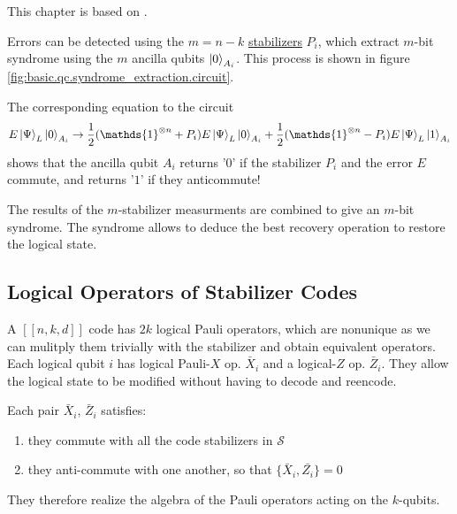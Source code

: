 This chapter is based on \cite{QECintro}.

Errors can be detected using the $m=n-k$ \hyperref[sec:basic.qc.stabilizer]{stabilizers} $P_i$, which extract $m$-bit syndrome using the $m$ ancilla qubits $\ket{0}_{A_i}$.
This process is shown in figure \ref{fig:basic.qc.syndrome_extraction.circuit}.

The corresponding equation to the circuit
\begin{equation}
    E \ket{\Psi}_L \ket{0}_{A_i} \rightarrow \frac{1}{2} (\mathds{1}^{\otimes n} + P_i) E \ket{\Psi}_L \ket{0}_{A_i} +  \frac{1}{2} (\mathds{1}^{\otimes n} - P_i) E   \ket{\Psi}_L \ket{1}_{A_i} 
\end{equation}
shows that the ancilla qubit $A_i$ returns '$0$' if the stabilizer $P_i$ and the error $E$ commute,
and returns '$1$' if they anticommute! 

The results of the $m$-stabilizer measurments are combined to give an $m$-bit syndrome.
The syndrome allows to deduce the best recovery operation to restore the logical state.


\subsection{Logical Operators of Stabilizer Codes}
A $[[n,k,d]]$ code has $2k$ logical Pauli operators, which are nonunique as we can mulitply them trivially with the stabilizer and obtain equivalent operators. \cite{QECintro} \cite{QECmemory} 
Each logical qubit $i$ has logical Pauli-$X$ op. $\bar{X}_i$ and a logical-$Z$ op. $\bar{Z}_i$. 
They allow the logical state to be modified without having to decode and reencode. \cite{QECintro}

Each pair $\bar{X}_i$, $\bar{Z}_i$ satisfies:
\begin{enumerate}
    \item they commute with all the code stabilizers in $\mathcal{S}$
    \item they anti-commute with one another, so that $\{ \bar{X}_i, \bar{Z_i}\}=0$
\end{enumerate}
They therefore realize the algebra of the Pauli operators acting on the $k$-qubits. \cite{QECmemory}


